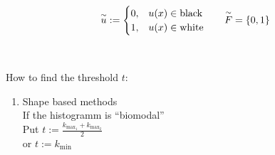 
$$ \begin{aligned}
		\overset{\sim}{u} & :=		
			\begin{cases}
				0, & u(x) \in \text{black} \\
				1, & u(x) \in \text{white}
			\end{cases}
			& \quad \overset{\sim}{F} = \left\{0,1\right\} 
\end{aligned} $$

~\par

How to find the threshold $t$: 
\begin{enumerate}[1.)]
  \item%
	\begin{minipage}[t]{0.6\linewidth}
	  Shape based methods\\
		If the histogramm is \enquote{biomodal}\\
		Put $ \displaystyle t:= \frac {k_{\max_1} + k_{\max_2}} {2}$\\
		or $\displaystyle t:= k_{\min}$
	\end{minipage} 
\end{enumerate}


